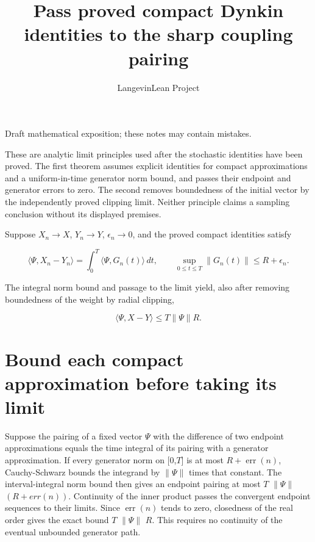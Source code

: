 \documentclass[11pt,a4paper]{article}
\title{\texorpdfstring{Pass proved compact Dynkin identities to the sharp coupling pairing}{Pass proved compact Dynkin identities to the sharp coupling pairing}}
\author{LangevinLean Project}
\date{}
\begin{document}
\maketitle
Draft mathematical exposition; these notes may contain mistakes.


These are analytic limit principles used after the stochastic identities have been proved. The first theorem assumes explicit identities for compact approximations and a uniform-in-time generator norm bound, and passes their endpoint and generator errors to zero. The second removes boundedness of the initial vector by the independently proved clipping limit. Neither principle claims a sampling conclusion without its displayed premises.



Suppose \(X_n\to X\), \(Y_n\to Y\), \(\epsilon_n\to0\), and the proved compact identities satisfy


\[\langle\Psi,X_n-Y_n\rangle
=\int_0^T\langle\Psi,G_n(t)\rangle\,dt,\qquad
\sup_{0\le t\le T}\|G_n(t)\|\le R+\epsilon_n.\]


The integral norm bound and passage to the limit yield, also after removing boundedness of the weight by radial clipping,


\[\langle\Psi,X-Y\rangle\le T\|\Psi\|R.\]
\section{\texorpdfstring{Bound each compact approximation before taking its limit}{Bound each compact approximation before taking its limit}}


Suppose the pairing of a fixed vector \(\Psi\) with the difference of two endpoint approximations equals the time integral of its pairing with a generator approximation. If every generator norm on [0,\(T\)] is at most \(R+\operatorname{err}(n)\), Cauchy-Schwarz bounds the integrand by \(\|\Psi\|\) times that constant. The interval-integral norm bound then gives an endpoint pairing at most \(T\) \(\|\Psi\|\)\((R+err(n))\). Continuity of the inner product passes the convergent endpoint sequences to their limits. Since \(\operatorname{err}(n)\) tends to zero, closedness of the real order gives the exact bound \(T\) \(\|\Psi\|\) \(R\). This requires no continuity of the eventual unbounded generator path.
\end{document}

